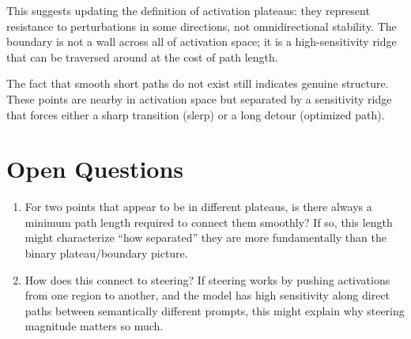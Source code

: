 \documentclass[11pt]{article}
\begin{document}
This suggests updating the definition of activation plateaus: they represent resistance to perturbations in some directions, not omnidirectional stability. The boundary is not a wall across all of activation space; it is a high-sensitivity ridge that can be traversed around at the cost of path length.

The fact that smooth short paths do not exist still indicates genuine structure. These points are nearby in activation space but separated by a sensitivity ridge that forces either a sharp transition (slerp) or a long detour (optimized path).

\section{Open Questions}

\begin{enumerate}
    \item For two points that appear to be in different plateaus, is there always a minimum path length required to connect them smoothly? If so, this length might characterize ``how separated'' they are more fundamentally than the binary plateau/boundary picture.
    \item How does this connect to steering? If steering works by pushing activations from one region to another, and the model has high sensitivity along direct paths between semantically different prompts, this might explain why steering magnitude matters so much.
\end{enumerate}
\end{document}
